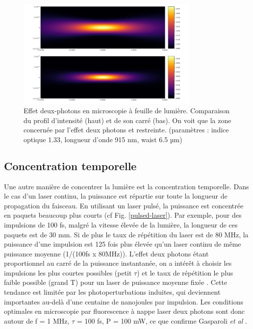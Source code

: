 
\begin{figure}
\centering
\includegraphics[width=0.8\textwidth]{./files/profile-intensity.png}
\caption{Effet deux-photons en microscopie à feuille de lumière. Comparaison du profil d'intensité (haut) et de son carré (bas). On voit que la zone concernée par l'effet deux photons et restreinte. (paramètres : indice optique 1.33, longueur d'onde 915 nm, waist 6.5 µm)
}
\label{2P-intensity-profile}
\end{figure}

\subsection{Concentration temporelle}\label{SECTIONconcentrationtemporelle}

Une autre manière de concentrer la lumière est la concentration temporelle. Dans le cas d'un laser continu, la puissance est répartie sur toute la longueur de propagation du faisceau. En utilisant un laser pulsé, la puissance est concentrée en paquets beaucoup plus courts (cf Fig. \ref{pulsed-laser}). Par exemple, pour des impulsions de 100 fs, malgré la vitesse élevée de la lumière, la longueur de ces paquets est de 30 mm. Si de plus le taux de répétition du laser est de 80 MHz, la puissance d'une impulsion est 125 fois plus élevée qu'un laser continu de même puissance moyenne (1/(100fs x 80MHz)). L'effet deux photons étant proportionnel au carré de la puissance instantanée, on a intérêt à choisir les impulsions les plus courtes possibles (petit $\tau$) et le taux de répétition le plus faible possible (grand T) pour un laser de puissance moyenne fixée \cite{maioli_fast_2020}. Cette tendance est limitée par les photoperturbations induites, qui deviennent importantes au-delà d'une centaine de nanojoules par impulsion. Les conditions optimales en microscopie par fluorescence à nappe laser deux photons sont donc autour de f = 1 MHz, $\tau$ = 100 fs, P = 100 mW, ce que confirme Gasparoli \emph{et al} \cite{gasparoli_is_2020}. %

